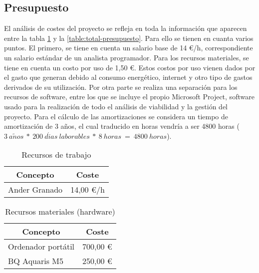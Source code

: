 \subsection{Presupuesto}
El análisis de costes del proyecto se refleja en toda la información que aparecen entre la tabla  \ref{table:recursos-trabajo} y la \ref{table:total-presupuesto}. Para ello se tienen en cuanta varios puntos. El primero, se tiene en cuenta un salario base de 14 \euro/h, correspondiente un salario estándar de un analista programador.
Para los recursos materiales, se tiene en cuenta un costo por uso de 1,50 \euro. Estos costos por uso vienen dados por el gasto que generan debido al consumo energético, internet y otro tipo de gastos derivados de su utilización. Por otra parte se realiza una separación para los recursos de software, entre los que se incluye el propio Microsoft Project, software usado para la realización de todo el análisis de viabilidad y la gestión del proyecto.
Para el cálculo de las amortizaciones se considera un tiempo de amortización de 3 años, el cual traducido en horas vendría a ser 4800 horas ($3\ a\tilde{n}os\ *\ 200\ d\acute{i}as\ laborables\ *\ 8\ horas\ =\ 4800\ horas$).

\begin{table}[H]
	\centering
	\begin{tabular}{ |l|r| } 
		\hline
		\multicolumn{1}{|c|}{Concepto} & 
			\multicolumn{1}{|c|}{Coste} \\
		\hline
		Ander Granado & 14,00 \euro/h \\
		\hline
	\end{tabular}
	\caption{Recursos de trabajo}
	\label{table:recursos-trabajo}
\end{table}

\begin{table}[H]
	\centering
	\begin{tabular}{ |l|r| } 
		\hline
		\multicolumn{1}{|c|}{Concepto} & 
			\multicolumn{1}{|c|}{Coste} \\
		\hline
		Ordenador portátil 	& 700,00 \euro \\
		BQ Aquaris M5 		& 250,00 \euro \\
		\hline
	\end{tabular}
	\caption{Recursos materiales (hardware)}
	\label{table:recursos-materiales}
\end{table}

